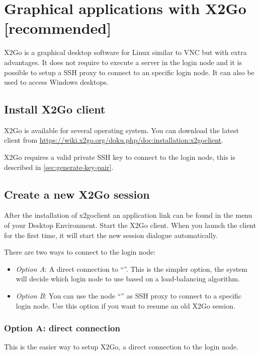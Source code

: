 \chapter{Graphical applications with X2Go [recommended]}
\label{ch:x2go}

X2Go is a graphical desktop software for Linux similar to VNC but with extra advantages.
It does not require to execute a server in the login node and it is possible to setup a SSH proxy to
connect to an specific login node.
It can also be used to access Windows desktops. 


\section{Install X2Go client}
\label{sec:x2go-client}
X2Go is available for several operating system. You can download the latest client from 
\url{https://wiki.x2go.org/doku.php/doc:installation:x2goclient}.

X2Go requires a valid private SSH key to connect to the login node, this is described in \autoref{sec:generate-key-pair}.


\section{Create a new X2Go session}
\label{sec:sessions-x2go}

After the installation of x2goclient an application link can be found in the menu of your Desktop Environment.
Start the X2Go client. When you launch the client for the first time, it will start the new session dialogue automatically.

There are two ways to connect to the login node:
\begin{itemize}
\item \emph{Option A}: A direct connection to ``\strong{\emph{\loginnode}}''. This is the simpler option, the system will decide which
login node to use based on a load-balancing algorithm.
\item \emph{Option B}: You can use the node ``\strong{\emph{\loginnode}}'' as SSH proxy to connect to a specific login node. Use this option if you want to resume an old X2Go session.
\end{itemize}

\subsection{Option A: direct connection}
This is the easier way to setup X2Go, a direct connection to the login node.

